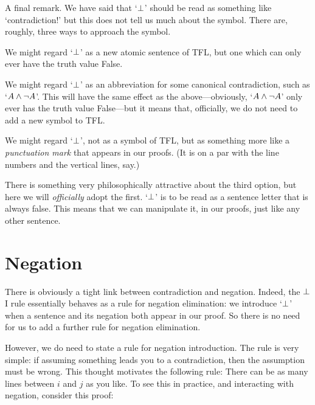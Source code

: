 A final remark. We have said that `$\bot$' should be read as something like `contradiction!' but this does not tell us much about the symbol. There are, roughly, three ways to approach the symbol. 
	\begin{ebullet}
		\item We might regard `$\bot$' as a new atomic sentence of TFL, but one which can only ever have the truth value False. 
		\item We might regard `$\bot$' as an abbreviation for some canonical contradiction, such as `$A \wedge \neg A$'. This will have the same effect as the above---obviously, `$A \wedge \neg A$' only ever has the truth value False---but it means that, officially, we do not need to add a new symbol to TFL.
		\item We might regard `$\bot$', not as a symbol of TFL, but as something more like a \emph{punctuation mark} that appears in our proofs. (It is on a par with the line numbers and the vertical lines, say.)
	\end{ebullet}
There is something very philosophically attractive about the third option, but here we will \emph{officially} adopt the first. `$\bot$' is to be read as a sentence letter that is always false. This means that we can manipulate it, in our proofs, just like any other sentence.


\section{Negation}
There is obviously a tight link between contradiction and negation. Indeed, the $\bot$I rule essentially behaves as a rule for negation elimination: we introduce `$\bot$' when a sentence and its negation both appear in our proof. So there is no need for us to add a further rule for negation elimination.

However, we do need to state a rule for negation introduction. The rule is very simple: if assuming something leads you to a contradiction, then the assumption must be wrong. This thought motivates the following rule:
There can be as many lines between $i$ and $j$ as you like. To see this in practice, and interacting with negation, consider this proof:
	\begin{pf}
		\open
		\close
	\end{pf}


